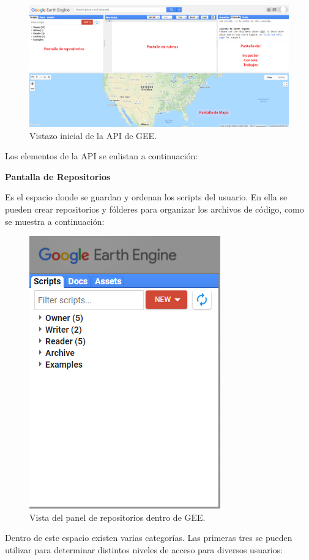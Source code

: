 \documentclass[
  12pt,
  letterpaper,
  twoside]{book}
\begin{document}
\begin{figure}

{\centering \includegraphics[width=1\linewidth]{Img/GEE_inicio_API} 

}

\caption{Vistazo inicial de la API de GEE.}\label{fig:unnamed-chunk-6}
\end{figure}

Los elementos de la API se enlistan a continuación:

\textbf{Pantalla de Repositorios}

Es el espacio donde se guardan y ordenan los scripts del usuario. En ella se pueden crear repositorios y fólderes para organizar los archivos de código, como se muestra a continuación:

\begin{figure}

{\centering \includegraphics[width=0.4\linewidth]{Img/left_panel} 

}

\caption{Vista del panel de repositorios dentro de GEE.}\label{fig:unnamed-chunk-7}
\end{figure}

Dentro de este espacio existen varias categorías. Las primeras tres se pueden utilizar para determinar distintos niveles de acceso para diversos usuarios:
\end{document}
